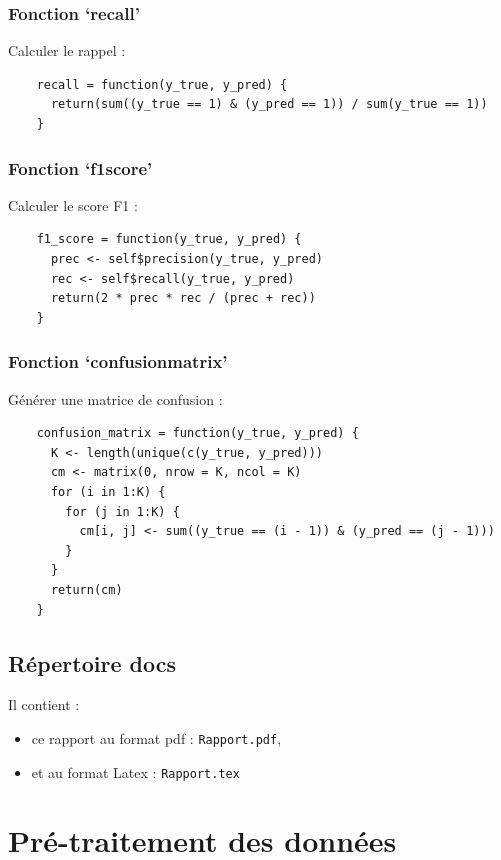 \documentclass[10pt,french]{report}
\begin{document}
    \subsubsection{Fonction \enquote*{recall}}

    Calculer le rappel :
    \begin{verbatim}
    recall = function(y_true, y_pred) {
      return(sum((y_true == 1) & (y_pred == 1)) / sum(y_true == 1))
    }
    \end{verbatim}

    \subsubsection{Fonction \enquote*{f1\textunderscore score}}

    Calculer le score F1 :
    \begin{verbatim}
    f1_score = function(y_true, y_pred) {
      prec <- self$precision(y_true, y_pred)
      rec <- self$recall(y_true, y_pred)
      return(2 * prec * rec / (prec + rec))
    }
    \end{verbatim}

    \subsubsection{Fonction \enquote*{confusion\textunderscore matrix}}

    Générer une matrice de confusion :
    \begin{verbatim}
    confusion_matrix = function(y_true, y_pred) {
      K <- length(unique(c(y_true, y_pred)))
      cm <- matrix(0, nrow = K, ncol = K)
      for (i in 1:K) {
        for (j in 1:K) {
          cm[i, j] <- sum((y_true == (i - 1)) & (y_pred == (j - 1)))
        }
      }
      return(cm)
    }
    \end{verbatim}
    
	\subsection{Répertoire docs}

	Il contient :
	\begin{itemize}
		\item ce rapport au format pdf : \texttt{Rapport.pdf},
		\item et au format Latex : \texttt{Rapport.tex}
	\end{itemize}

	\section{Pré-traitement des données}
\end{document}
